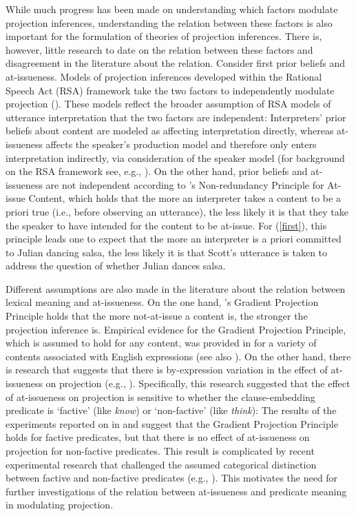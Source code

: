 \documentclass[11pt,fleqn]{article}
\newcommand{\6}{\mbox{$[\hspace*{-.6mm}[$}}
\newcommand{\9}{\mbox{$]\hspace*{-.6mm}]$}}
\newcommand{\citepos}[1]{\citeauthor{#1}'s \citeyear{#1}}
\begin{document}
While much progress has been made on understanding which factors modulate projection inferences, understanding the relation between these factors is also important for the formulation of theories of projection inferences. There is, however, little research to date on the relation between these factors and disagreement in the literature about the relation. Consider first prior beliefs and at-issueness. Models of projection inferences developed within the Rational Speech Act (RSA) framework take the two factors to independently modulate projection (\citealt*{qing-etal2016,stevens-etal2017,warstadt2022,pan-degen2023}). These models reflect the broader assumption of RSA models of utterance interpretation that the two factors are independent: Interpreters' prior beliefs about content are modeled as affecting interpretation directly, whereas at-issueness affects the speaker's production model and therefore only enters interpretation indirectly, via consideration of the speaker model (for background on the RSA framework see, e.g., \citealt{degen2023-RSA}). On the other hand, prior beliefs and at-issueness are not independent according to \citepos{tonhauser-etal-eval} Non-redundancy Principle for At-issue Content, which holds that the more an interpreter takes a content to be a priori true (i.e., before observing an utterance), the less likely it is that they take the speaker to have intended for the content to be at-issue.  For (\ref{first}), this principle leads one to expect that the more an interpreter is a priori committed to Julian dancing salsa, the less likely it is that Scott's utterance is taken to address the question of whether Julian dances salsa. 

Different assumptions are also made in the literature about the relation between lexical meaning and at-issueness. On the one hand, \citepos{tbd-variability} Gradient Projection Principle holds that the more not-at-issue a content is, the stronger the projection inference is. Empirical evidence for the Gradient Projection Principle, which is assumed to hold for any content, was provided in \citealt{tbd-variability} for a variety of contents associated with English expressions (see also \citealt{tonhauser-salt26}). On the other hand, there is research that suggests that there is by-expression variation in the effect of at-issueness on projection (e.g., \citealt*{djaerv-bacovcin-salt27, djaerv-bacovcin2020, mahler-etal2020}). Specifically, this research suggested that the effect of at-issueness on projection is sensitive to whether the clause-embedding predicate is  `factive'  (like {\em know}) or `non-factive' (like {\em think}): The results of the experiments reported on in \citealt{djaerv-bacovcin-salt27,djaerv-bacovcin2020} and \citealt{mahler-etal2020} suggest that the Gradient Projection Principle holds for factive predicates, but that there is no effect of at-issueness on projection for non-factive predicates. This result is complicated by recent experimental research that challenged the assumed categorical distinction between factive and non-factive predicates (e.g., \citealt{demarneffe-etal-sub23,degen-tonhauser-language}). This motivates the need for further investigations of the relation between at-issueness and predicate meaning in modulating projection.
\end{document}
